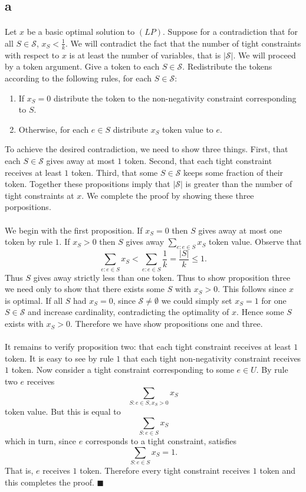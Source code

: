 \documentclass[letterpaper,12pt,oneside,onecolumn]{article}
\newcommand{\cS}{\mathcal{S}} \newcommand{\cT}{\mathcal{T}}
\begin{document}
\subsection*{a}
\paragraph{}
Let $x$ be a basic optimal solution to $(LP)$. Suppose for a contradiction that for all $S \in \cS$, $x_S < \frac{1}{k}$. We will contradict the fact that the number of tight constraints with respect to $x$ is at least the number of variables, that is $|\cS|$. We will proceed by a token argument. Give a token to each $S \in \cS$. Redistribute the tokens according to the following rules, for each $S \in \cS$:
\begin{enumerate}
\item If $x_S = 0$ distribute the token to the non-negativity constraint corresponding to $S$.
\item Otherwise, for each $e \in S$ distribute $x_S$ token value to $e$.
\end{enumerate}
To achieve the desired contradiction, we need to show three things. First, that each $S \in \cS$ gives away at most $1$ token. Second, that each tight constraint receives at least $1$ token. Third, that some $S \in \cS$ keeps some fraction of their token. Together these propositions imply that $|\cS|$ is greater than the number of tight constraints at $x$. We complete the proof by showing these three porpositions.
\paragraph{}
We begin with the first proposition. If $x_S = 0$ then $S$ gives away at most one token by rule $1$. If $x_S > 0$ then $S$ gives away $\sum_{e: e\in S} x_S$ token value. Observe that
$$\sum_{e: e\in S} x_S < \sum_{e: e\in S} \frac{1}{k} = \frac{|S|}{k} \leq 1.$$
Thus $S$ gives away strictly less than one token. Thus to show proposition three we need only to show that there exists some $S$ with $x_S > 0$. This follows since $x$ is optimal. If all $S$ had $x_S = 0$, since $\cS \neq\emptyset$ we could simply set $x_S = 1$ for one $S \in \cS$ and increase cardinality, contradicting the optimality of $x$. Hence some $S$ exists with $x_S > 0$. Therefore we have show propositions one and three.
\paragraph{}
It remains to verify proposition two: that each tight constraint receives at least $1$ token. It is easy to see by rule $1$ that each tight non-negativity constraint receives $1$ token. Now consider a tight constraint corresponding to some $e \in U$. By rule two $e$ receives
$$\sum_{S : e\in S, x_S > 0} x_S$$
token value. But this is equal to
$$\sum_{S: e\in S} x_S$$
which in turn, since $e$ corresponds to a tight constraint, satisfies
$$\sum_{S: e\in S} x_S = 1.$$
That is, $e$ receives $1$ token. Therefore every tight constraint receives $1$ token and this completes the proof. $\blacksquare$
\end{document}

